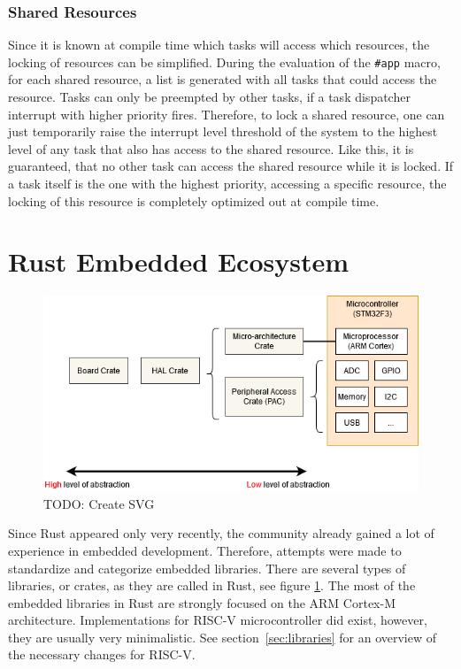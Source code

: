 \subsubsection{Shared Resources}
Since it is known at compile time which tasks will access which resources, the locking of resources can be simplified.
During the evaluation of the \texttt{\#app} macro, for each shared resource, a list is generated with all tasks that could access the resource.
Tasks can only be preempted by other tasks, if a task dispatcher interrupt with higher priority fires.
Therefore, to lock a shared resource, one can just temporarily raise the interrupt level threshold of the system to the highest level of any task that also has access to the shared resource. Like this, it is guaranteed, that no other task can access the shared resource while it is locked.
If a task itself is the one with the highest priority, accessing a specific resource, the locking of this resource is completely optimized out at compile time.

\section{Rust Embedded Ecosystem}

\begin{figure}
  \centerfloat
  \includegraphics[width=\textwidth]{fig/crates.png}
  \caption{TODO: Create SVG}%
  \label{fig:embedded_crates}
\end{figure}

Since Rust appeared only very recently, the community already gained a lot of experience in embedded development.
Therefore, attempts were made to standardize and categorize embedded libraries.
There are several types of libraries, or crates, as they are called in Rust, see figure \ref{fig:embedded_crates}.
The most of the embedded libraries in Rust are strongly focused on the ARM Cortex-M architecture. Implementations for RISC-V microcontroller did exist, however, they are usually very minimalistic. See section~\ref{sec:libraries} for an overview of the necessary changes for RISC-V.

